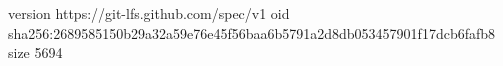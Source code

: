 version https://git-lfs.github.com/spec/v1
oid sha256:2689585150b29a32a59e76e45f56baa6b5791a2d8db053457901f17dcb6fafb8
size 5694

